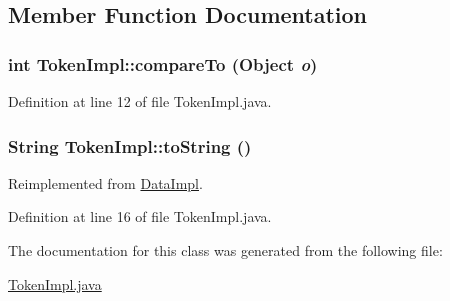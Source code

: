 \subsection{Member Function Documentation}
\hypertarget{classTokenImpl_a0}{
\subsubsection[compareTo]{\setlength{\rightskip}{0pt plus 5cm}int Token\-Impl::compare\-To (Object {\em o})}}
\label{classTokenImpl_a0}




Definition at line 12 of file Token\-Impl.java.\hypertarget{classTokenImpl_a1}{
\subsubsection[toString]{\setlength{\rightskip}{0pt plus 5cm}String Token\-Impl::to\-String ()}}
\label{classTokenImpl_a1}




Reimplemented from \hyperlink{classDataImpl_a6}{Data\-Impl}.

Definition at line 16 of file Token\-Impl.java.

The documentation for this class was generated from the following file:\begin{CompactItemize}
\item 
\hyperlink{TokenImpl_8java-source}{Token\-Impl.java}\end{CompactItemize}
